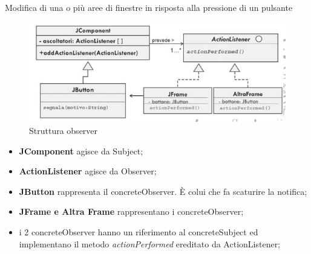  Modifica di una o più aree di finestre in risposta alla pressione di un pulsante
\begin{figure}[H]
\centering
\includegraphics[scale=0.8]{images/esempio1Observer}
\caption{Struttura observer\label{fig:UC3}}
\end{figure}
\begin{itemize}
	\item \textbf{JComponent} agisce da Subject;
	\item \textbf{ActionListener} agisce da Observer;
	\item \textbf{JButton} rappresenta il concreteObserver. È colui che fa scaturire la notifica;
	\item \textbf{JFrame e Altra Frame} rappresentano i concreteObserver;
	\item i 2 concreteObserver hanno un riferimento al concreteSubject ed implementano il metodo \textit{actionPerformed} ereditato da ActionListener;
	\end{itemize}